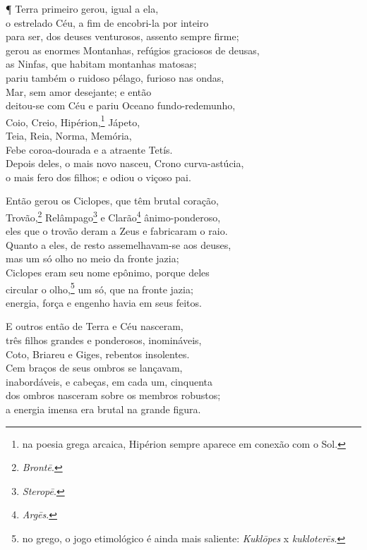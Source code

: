 ¶ Terra primeiro gerou, igual a ela,\\
o estrelado Céu, a fim de encobri-la por inteiro\\
para ser, dos deuses venturosos, assento sempre firme;\\
gerou as enormes Montanhas, refúgios graciosos de deusas,\\
as Ninfas, que habitam montanhas matosas; \\
pariu também o ruidoso pélago, furioso nas ondas,\\
Mar, sem amor desejante; e então\\
deitou-se com Céu e pariu Oceano fundo-redemunho,\\
Coio, Creio, Hipérion,\footnote{na poesia grega arcaica, Hipérion sempre aparece em conexão com o Sol.} Jápeto,\\
Teia, Reia, Norma, Memória, \\
Febe coroa-dourada e a atraente Tetís.\\
Depois deles, o mais novo nasceu, Crono curva-astúcia,\\
o mais fero dos filhos; e odiou o viçoso pai.

\quad{}Então gerou os Ciclopes, que têm brutal coração,\\
Trovão,\footnote{\emph{Brontē}.} Relâmpago\footnote{\emph{Steropē}.} e Clarão\footnote{\emph{Argēs}.} ânimo-ponderoso, \\
eles que o trovão deram a Zeus e fabricaram o raio.\\
Quanto a eles, de resto assemelhavam-se aos deuses,\\
mas um só olho no meio da fronte jazia;\\
Ciclopes eram seu nome epônimo, porque deles\\
circular o olho,\footnote{no grego, o jogo etimológico é ainda mais saliente: \emph{Kuklōpes} x \emph{kukloterēs}.} um só, que na fronte jazia;\\
energia, força e engenho havia em seus feitos.

\quad{}E outros então de Terra e Céu nasceram,\\
três filhos grandes e ponderosos, inomináveis,\\
Coto, Briareu e Giges, rebentos insolentes.\\
Cem braços de seus ombros se lançavam, \\
inabordáveis, e cabeças, em cada um, cinquenta\\
dos ombros nasceram sobre os membros robustos;\\
a energia imensa era brutal na grande figura.

